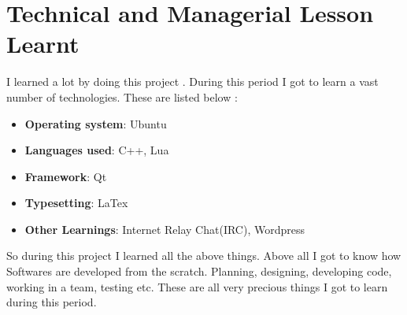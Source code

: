 \section{Technical and Managerial Lesson Learnt}
I learned a lot by doing this project . During this period I got to learn a vast 
number of technologies. These are listed below :
\begin{itemize}
\item {\bf{Operating system}}: Ubuntu
\item {\bf{Languages used}}: C++, Lua
\item {\bf{Framework}}: Qt 
\item {\bf{Typesetting}}: LaTex
\item {\bf{Other Learnings}}: Internet Relay Chat(IRC), Wordpress

\end{itemize}

So during this project I learned all the above things. Above all I got to know 
how Softwares are developed from the scratch. Planning, designing, developing code, 
working in a team, testing etc. These are all very precious things I got to learn 
during this period.  
